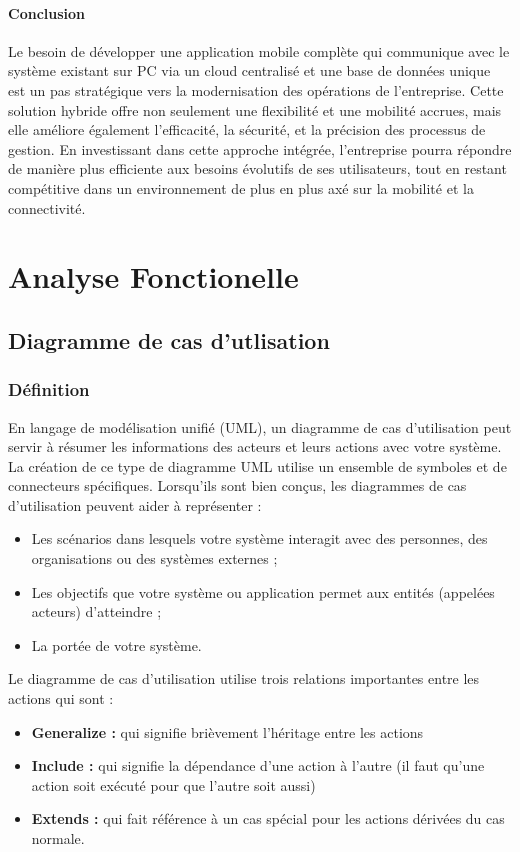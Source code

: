 \documentclass[a4paper, oneside, 12pt, final]{extreport}
\begin{document}
\subsubsection{Conclusion}
Le besoin de développer une application mobile complète qui communique avec le système existant sur PC via un cloud centralisé et une base de données unique est un pas stratégique vers la modernisation des opérations de l'entreprise. Cette solution hybride offre non seulement une flexibilité et une mobilité accrues, mais elle améliore également l'efficacité, la sécurité, et la précision des processus de gestion. En investissant dans cette approche intégrée, l'entreprise pourra répondre de manière plus efficiente aux besoins évolutifs de ses utilisateurs, tout en restant compétitive dans un environnement de plus en plus axé sur la mobilité et la connectivité.

\chapter{Analyse Fonctionelle}
\section{Diagramme de cas d'utlisation}

\subsection{Définition}
En langage de modélisation unifié (UML), un diagramme de cas d'utilisation peut 
servir à résumer les informations des acteurs et leurs actions avec votre système. La 
création de ce type de diagramme UML utilise un ensemble de symboles et de 
connecteurs spécifiques. Lorsqu'ils sont bien conçus, les diagrammes de cas 
d'utilisation peuvent aider à représenter : 
\begin{itemize}
\item Les scénarios dans lesquels votre système interagit avec des personnes, des 
organisations ou des systèmes externes ; 
\item Les objectifs que votre système ou application permet aux entités (appelées acteurs) 
d'atteindre ; 
\item La portée de votre système. 
\end{itemize}
Le diagramme de cas d’utilisation utilise trois relations importantes entre les actions 
qui sont :  
\begin{itemize}
\item \textbf{ Generalize :} qui signifie brièvement l’héritage entre les actions 
\item \textbf{ Include :} qui signifie la dépendance d’une action à l’autre (il faut qu’une action soit 
exécuté pour que l’autre soit aussi) 
\item \textbf{Extends :} qui fait référence à un cas spécial pour les actions dérivées du cas normale.  
\end{itemize}
\end{document}
